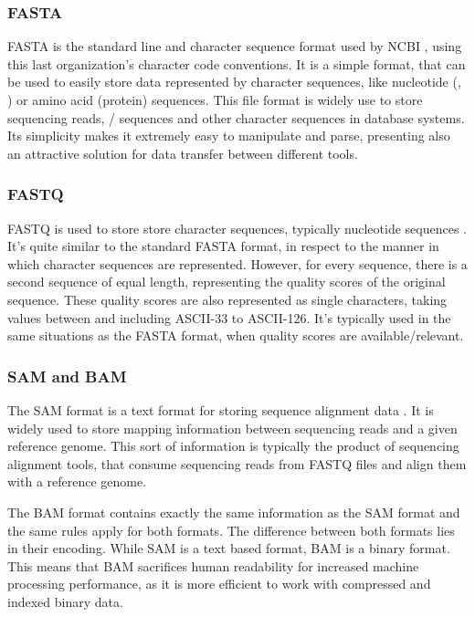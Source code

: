 \subsubsection*{FASTA}

FASTA is the standard line and character sequence format used by NCBI
\cite{ncbi:fasta}, using this last organization's character code conventions. It
is a simple format, that can be used to easily store data represented by
character sequences, like nucleotide (\dna, \rna) or amino acid (protein)
sequences. This file format is widely use to store sequencing reads, \dna/\rna{}
sequences and other character sequences in database systems. Its simplicity
makes it extremely easy to manipulate and parse, presenting also an attractive
solution for data transfer between different tools.

\subsubsection*{FASTQ}

FASTQ is used to store store character sequences, typically nucleotide sequences
\cite{Cock2010}. It's quite similar to the standard FASTA format, in respect to
the manner in which character sequences are represented. However, for every
sequence, there is a second sequence of equal length, representing the quality
scores of the original sequence. These quality scores are also represented as
single characters, taking values between and including ASCII-33 to ASCII-126.
It's typically used in the same situations as the FASTA format, when quality
scores are available/relevant.

\subsubsection*{SAM and BAM}

The SAM format is a text format for storing sequence alignment data
\cite{genome:sam}. It is widely used to store mapping information between
sequencing reads and a given reference genome. This sort of information is
typically the product of sequencing alignment tools, that consume sequencing
reads from FASTQ files and align them with a reference genome.

The BAM format contains exactly the same information as the SAM format and the
same rules apply for both formats. The difference between both formats lies in
their encoding. While SAM is a text based format, BAM is a binary format. This
means that BAM sacrifices human readability for increased machine processing
performance, as it is more efficient to work with compressed and indexed binary
data.

